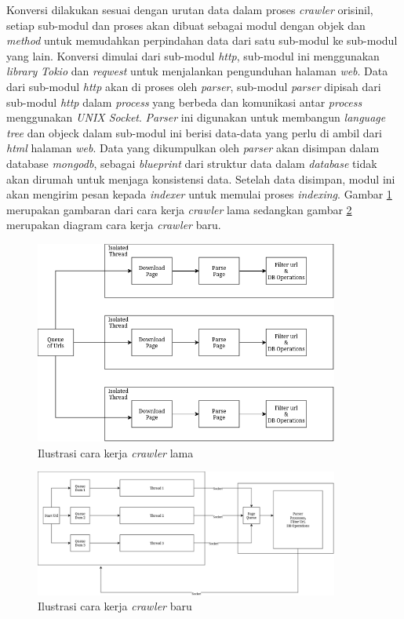 Konversi dilakukan sesuai dengan urutan data dalam proses \emph{crawler} orisinil, setiap sub-modul dan proses akan dibuat sebagai modul dengan objek dan \emph{method} untuk memudahkan perpindahan data dari satu sub-modul ke sub-modul yang lain. Konversi dimulai dari sub-modul \emph{http}, sub-modul ini menggunakan \emph{library} \emph{Tokio} dan \emph{reqwest} untuk menjalankan pengunduhan halaman \emph{web}. Data dari sub-modul \emph{http} akan di proses oleh \emph{parser}, sub-modul \emph{parser} dipisah dari sub-modul \emph{http} dalam \emph{process} yang berbeda dan komunikasi antar \emph{process} menggunakan \emph{UNIX Socket}. \emph{Parser} ini digunakan untuk membangun \emph{language tree} dan objeck dalam sub-modul ini berisi data-data yang perlu di ambil dari \emph{html} halaman \emph{web}. Data yang dikumpulkan oleh \emph{parser} akan disimpan dalam database \emph{mongodb}, sebagai \emph{blueprint} dari struktur data dalam \emph{database} tidak akan dirumah untuk menjaga konsistensi data. Setelah data disimpan, modul ini akan mengirim pesan kepada \emph{indexer} untuk memulai proses \emph{indexing}. Gambar \ref{gambar:old_crawler_diagram} merupakan gambaran dari cara kerja \emph{crawler} lama sedangkan gambar \ref{gambar:new_crawler_diagram} merupakan diagram cara kerja \emph{crawler} baru.

\begin{figure}[H]
	\centering
	\includegraphics[keepaspectratio, width=10cm]{gambar/old-crawler-multithread-diagram.png}
  \caption{Ilustrasi cara kerja \emph{crawler} lama}
	\label{gambar:old_crawler_diagram}
\end{figure}

\begin{figure}[H]
	\centering
	\includegraphics[keepaspectratio, width=10cm]{gambar/new-crawler-multithread-diagram.png}
  \caption{Ilustrasi cara kerja \emph{crawler} baru}
	\label{gambar:new_crawler_diagram}
\end{figure}

